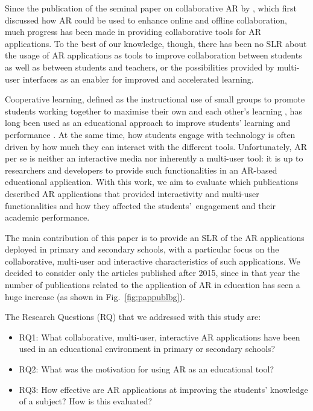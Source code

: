 Since the publication of the seminal paper on collaborative \gls{AR} by \citet{billinghurst2002collaborative}, which first discussed how AR could be used to enhance online and offline collaboration, much progress has been made in providing collaborative tools for \gls{AR} applications. To the best of our knowledge, though, there has been no \gls{SLR} about the usage of \gls{AR} applications as tools to improve collaboration between students as well as between students and teachers, or the possibilities provided by multi-user interfaces as an enabler for improved and accelerated learning. 

Cooperative learning, defined as the instructional use of small groups to promote students working together to maximise their own and each other's learning \citep{johnson1991cooperation}, has long been used as an educational approach to improve students' learning and performance \citep{johnson2008active, kuh2011piecing}. At the same time, how students engage with technology is often driven by how much they can interact with the different tools. Unfortunately, AR per se is neither an interactive media nor inherently a multi-user tool: it is up to researchers and developers to provide such functionalities in an AR-based educational application. With this work, we aim to evaluate which publications described AR applications that provided interactivity and multi-user functionalities and how they affected the students'\ engagement and their academic performance.

The main contribution of this paper is to provide an \gls{SLR} of the \gls{AR} applications deployed in primary and secondary schools, with a particular focus on the collaborative, multi-user and interactive characteristics of such applications. We decided to consider only the articles published after 2015, since in that year the number of publications related to the application of \gls{AR} in education has seen a huge increase (as shown in Fig.~\ref{fig:pappublbg}).

The Research Questions (RQ) that we addressed with this study are:
\begin{itemize}
    \item \gls{RQ}1: What collaborative, multi-user, interactive \gls{AR} applications have been used in an educational environment in primary or secondary schools?
    \item \gls{RQ}2: What was the motivation for using \gls{AR} as an educational tool?
    \item \gls{RQ}3: How effective are \gls{AR} applications at improving the students' knowledge of a subject? How is this evaluated?
\end{itemize}

